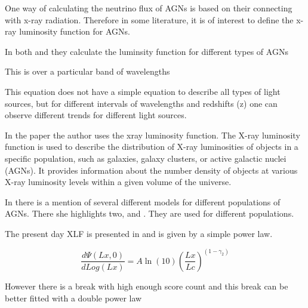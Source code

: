 \documentclass[11pt]{article}
\begin{document}
One way of calculating the neutrino flux of AGNs is based on their connecting with x-ray radiation. Therefore in some literature, it is of interest to define the x-ray luminosity function for AGNs.

In both \cite{Ajello_2009} and \cite{Ueda_2003} they calculate the luminsity function for different types of AGNs



This is over a particular band of wavelengths


This equation does not have a simple equation to describe all types of light sources, but for different intervals of wavelengths and redshifts (z) one can observe different trends for different light sources. 

In the paper \cite{Jacobsen:2015mga} the author uses the xray luminosity function. The X-ray luminosity function is used to describe the distribution of X-ray luminosities of objects in a specific population, such as galaxies, galaxy clusters, or active galactic nuclei (AGNs). It provides information about the number density of objects at various X-ray luminosity levels within a given volume of the universe.


In \cite{Jacobsen:2015mga} there is a mention of several different models for different populations of AGNs. There she highlights two, \cite{Ajello_2009} and \cite{Ueda_2003}. They are used for different populations.

The present day XLF is presented in \cite{Ajello_2009} and is given by a simple power law. 

\begin{equation}
    \frac{d\Psi(Lx,0)}{dLog(Lx)} = A\ln (10){(\frac{Lx}{Lc})}^{(1-\gamma_2)}
\end{equation}

However there is a break with high enough score count and this break can be better fitted with a double power law 
\end{document}
